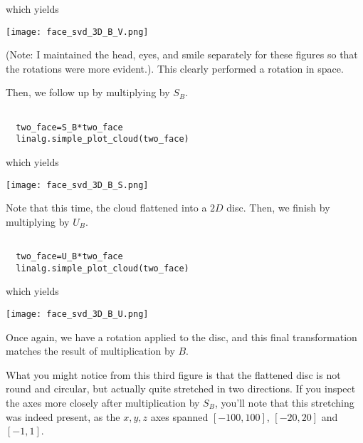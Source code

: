 \documentclass{ximera}
\begin{document}
which yields

\begin{center}
  \texttt{[image: face\_svd\_3D\_B\_V.png]}
\end{center}

(Note: I maintained the head, eyes, and smile separately for these figures so that the rotations were more evident.). This clearly performed a rotation in space.

Then, we follow up by multiplying by $S_B$.

\begin{verbatim}

  two_face=S_B*two_face
  linalg.simple_plot_cloud(two_face)

\end{verbatim}

which yields

\begin{center}
  \texttt{[image: face\_svd\_3D\_B\_S.png]}
\end{center}

Note that this time, the cloud flattened into a $2D$ disc. Then, we finish by multiplying by $U_B$.

\begin{verbatim}

  two_face=U_B*two_face
  linalg.simple_plot_cloud(two_face)

\end{verbatim}

which yields

\begin{center}
  \texttt{[image: face\_svd\_3D\_B\_U.png]}
\end{center}

Once again, we have a rotation applied to the disc, and this final transformation matches the result of multiplication by $B$.

What you might notice from this third figure is that the flattened disc is not round and circular, but actually quite stretched in two directions. If you inspect the axes more closely after multiplication by $S_B$, you'll note that this stretching was indeed present, as the $x,y,z$ axes spanned $[-100,100]$, $[-20,20]$ and $[-1,1]$.
\end{document}
